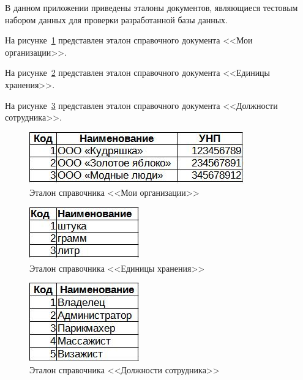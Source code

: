 \documentclass[12pt, a4paper, simple]{eskdtext}
\begin{document}
    

    \thispagestyle{plain}
    \pagestyle{plain}
    \hspace{0pt}

    В данном приложении приведены эталоны документов,
    являющиеся тестовым набором данных для проверки разработанной базы данных.

    На рисунке~\ref{fig:CP_MoiOrg_etalon} представлен эталон справочного документа <<Мои организации>>.

    На рисунке~\ref{fig:CP_EdHran_etalon} представлен эталон справочного документа <<Единицы хранения>>.

    На рисунке~\ref{fig:CP_DoljSotr_etalon} представлен эталон справочного документа <<Должности сотрудника>>.

    \begin{figure}[!h]
        \centering
        \includegraphics[]
            {_docs/СП_МоиОрг_эталон.jpg}
        \caption{Эталон справочника <<Мои организации>>}
        \label{fig:CP_MoiOrg_etalon}
    \end{figure}

    \begin{figure}[!h]
        \centering
        \includegraphics[]
            {_docs/СП_ЕдХран_эталон.jpg}
        \caption{Эталон справочника <<Единицы хранения>>}
        \label{fig:CP_EdHran_etalon}
    \end{figure}

    \begin{figure}[!h]
        \centering
        \includegraphics[]
            {_docs/СП_ДолжнСотр_эталон.jpg}
        \caption{Эталон справочника <<Должности сотрудника>>}
        \label{fig:CP_DoljSotr_etalon}
    \end{figure}
\end{document}
